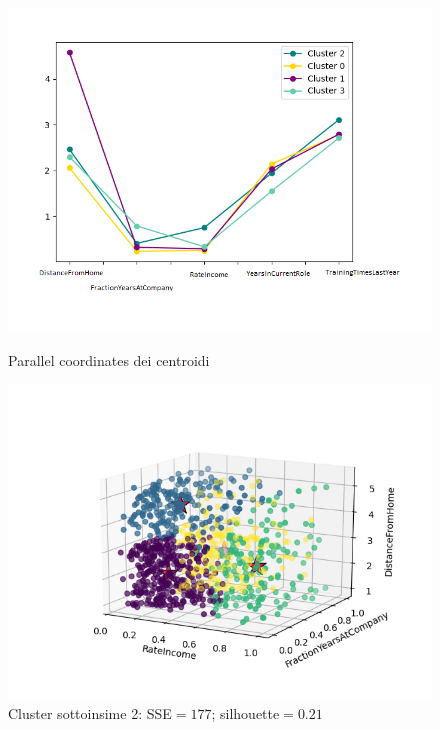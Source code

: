 \documentclass[english]{article}
\begin{document}
\begin{figure}[H]
\begin{minipage}[b]{0.47\textwidth}
\centering
\includegraphics[width=\textwidth]{par_cor2.png}
\caption{Parallel coordinates dei centroidi}
\label{etichetta1}
\end{minipage}
\hfill
\begin{minipage}[b]{0.55\textwidth}
\includegraphics[scale=0.6]{rate_fraction_distance2.png}
\caption{Cluster sottoinsime 2: SSE$=177$; silhouette$=0.21$}
\label{etichetta2}
\end{minipage}
\end{figure}
\end{document}
